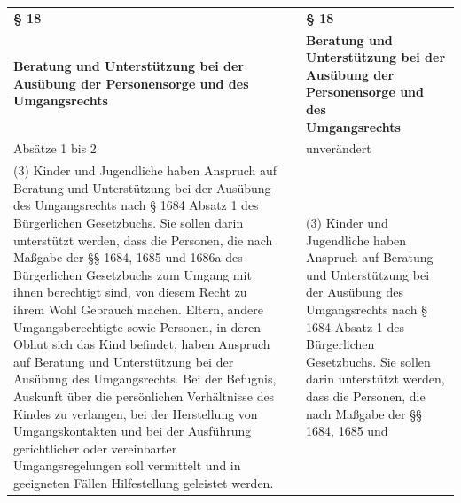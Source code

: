 \documentclass[10pt,a4paper,landscape]{article}
\begin{document}
\begin{longtable}{|L{8.2cm}|L{8.2cm}|L{8.2cm}|}
\hhline{|---|}
\textbf{\S{} 18} &  & \textbf{\S{} 18} \\
\hhline{|---|}
\textbf{Beratung und Unterstützung bei der  \newline Ausübung der Personensorge und des  \newline Umgangsrechts} &  & \textbf{Beratung und Unterstützung bei der  \newline Ausübung der Personensorge und des  \newline Umgangsrechts} \\
\hhline{|---|}
Absätze 1 bis 2 &  & unverändert \\
\hhline{|---|}
(3) Kinder und Jugendliche haben  \newline Anspruch auf Beratung und Unterstützung  \newline bei der Ausübung des Umgangsrechts  \newline nach \S{} 1684 Absatz 1 des Bürgerlichen  \newline Gesetzbuchs. Sie sollen darin unterstützt  \newline werden, dass die Personen, die nach  \newline Maßgabe der \S{}\S{} 1684, 1685 und 1686a  \newline des Bürgerlichen Gesetzbuchs zum  \newline Umgang mit ihnen berechtigt sind, von  \newline diesem Recht zu ihrem Wohl Gebrauch  \newline machen. Eltern, andere  \newline Umgangsberechtigte sowie Personen, in  \newline deren Obhut sich das Kind befindet, haben  \newline Anspruch auf Beratung und Unterstützung  \newline bei der Ausübung des Umgangsrechts. Bei  der Befugnis, Auskunft über die  \newline persönlichen Verhältnisse \textcolor{diffred}{des Kindes} zu  \newline verlangen, bei der Herstellung von  \newline Umgangskontakten und bei der Ausführung  \newline gerichtlicher oder vereinbarter  \newline Umgangsregelungen soll vermittelt und in  \newline geeigneten Fällen Hilfestellung geleistet  \newline \textcolor{diffred}{werden.} &  & (3) Kinder und Jugendliche haben  \newline Anspruch auf Beratung und Unterstützung  \newline bei der Ausübung des Umgangsrechts  \newline nach \S{} 1684 Absatz 1 des Bürgerlichen  \newline Gesetzbuchs. Sie sollen darin unterstützt  \newline werden, dass die Personen, die nach  \newline Maßgabe der \S{}\S{} 1684, 1685 und 
\end{longtable}
\end{document}
